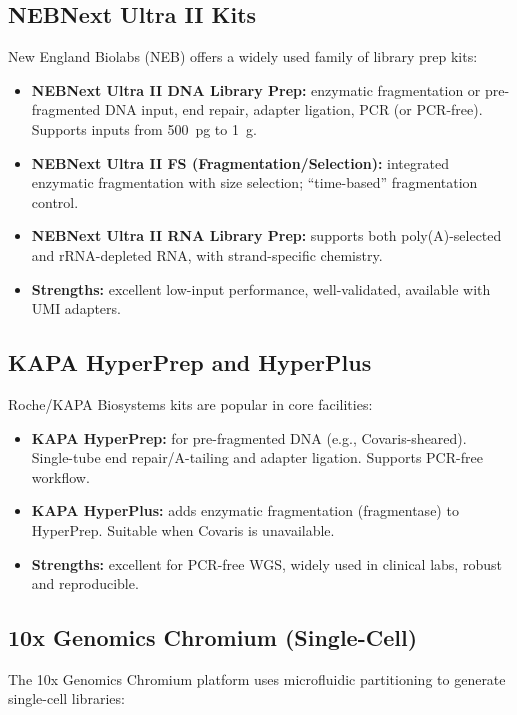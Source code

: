 \subsection{NEBNext Ultra II Kits}

New England Biolabs (NEB) offers a widely used family of library prep kits:

\begin{itemize}[nosep]
  \item \textbf{NEBNext Ultra II DNA Library Prep:} enzymatic fragmentation or pre-fragmented DNA input, end repair, adapter ligation, PCR (or PCR-free). Supports inputs from 500~pg to 1~\textmu g.
  \item \textbf{NEBNext Ultra II FS (Fragmentation/Selection):} integrated enzymatic fragmentation with size selection; ``time-based'' fragmentation control.
  \item \textbf{NEBNext Ultra II RNA Library Prep:} supports both poly(A)-selected and rRNA-depleted RNA, with strand-specific chemistry.
  \item \textbf{Strengths:} excellent low-input performance, well-validated, available with UMI adapters.
\end{itemize}

\subsection{KAPA HyperPrep and HyperPlus}

Roche/KAPA Biosystems kits are popular in core facilities:

\begin{itemize}[nosep]
  \item \textbf{KAPA HyperPrep:} for pre-fragmented DNA (e.g., Covaris-sheared). Single-tube end repair/A-tailing and adapter ligation. Supports PCR-free workflow.
  \item \textbf{KAPA HyperPlus:} adds enzymatic fragmentation (fragmentase) to HyperPrep. Suitable when Covaris is unavailable.
  \item \textbf{Strengths:} excellent for PCR-free WGS, widely used in clinical labs, robust and reproducible.
\end{itemize}

\subsection{10x Genomics Chromium (Single-Cell)}

The 10x Genomics Chromium platform uses microfluidic partitioning to generate single-cell libraries:

